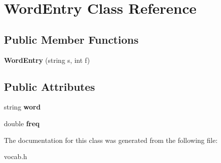 \hypertarget{classWordEntry}{\section{\-Word\-Entry \-Class \-Reference}
\label{classWordEntry}
}
\subsection*{\-Public \-Member \-Functions}
\begin{DoxyCompactItemize}
\item 
\hypertarget{classWordEntry_a17143bc4f797f9ceeb74f823e4e036c2}{{\bfseries \-Word\-Entry} (string s, int f)}\label{classWordEntry_a17143bc4f797f9ceeb74f823e4e036c2}

\end{DoxyCompactItemize}
\subsection*{\-Public \-Attributes}
\begin{DoxyCompactItemize}
\item 
\hypertarget{classWordEntry_ab7363813b06466424cffae29ba6f2d86}{string {\bfseries word}}\label{classWordEntry_ab7363813b06466424cffae29ba6f2d86}

\item 
\hypertarget{classWordEntry_af8c1c29276514bdc010fd47b7c9af81f}{double {\bfseries freq}}\label{classWordEntry_af8c1c29276514bdc010fd47b7c9af81f}

\end{DoxyCompactItemize}


\-The documentation for this class was generated from the following file\-:\begin{DoxyCompactItemize}
\item 
vocab.\-h\end{DoxyCompactItemize}
